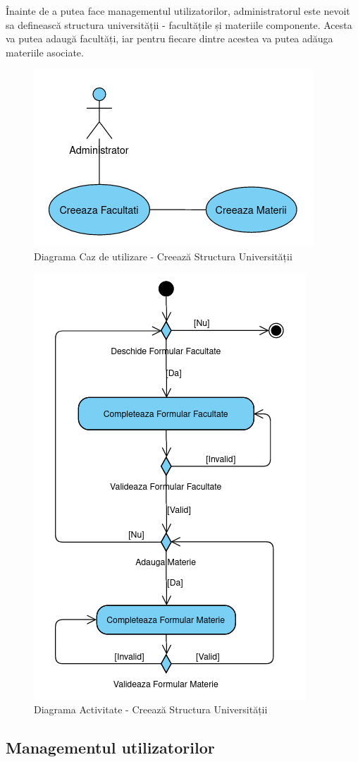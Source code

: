 \documentclass[12pt, a4paper, oneside, romanian]{teza-upb}
\begin{document}
Înainte de a putea face managementul utilizatorilor, administratorul este nevoit sa definească structura universității - facultățile și materiile componente. Acesta va putea adaugă facultăți, iar pentru fiecare dintre acestea va putea adăuga materiile asociate.

\begin{figure}[H]
\centering
\includegraphics*[width=0.5\columnwidth]{diagrama-use-case-creeaza-structura-universitatii}
\caption{Diagrama Caz de utilizare - Creează Structura Universității}
\label{diagrama-use-case-creeaza-structura-universitatii}
\end{figure}


\begin{figure}[H]
\centering
\includegraphics*[width=0.5\columnwidth]{diagrama-activitate-creeaza-structura-universitatii}
\caption{Diagrama Activitate - Creează Structura Universității}
\label{diagrama-activitate-creeaza-structura-universitatii}
\end{figure}

\subsection{Managementul utilizatorilor}
\end{document}
